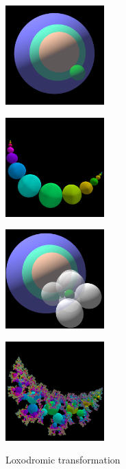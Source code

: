 \begin{figure}[h!tbp]
 \begin{minipage}{0.24\hsize}
  \center
  \includegraphics[width=1.5in, height=1.5in, keepaspectratio]{../img/klein/3diis/loxoGenSimple.pdf}
  \label{fig:loxoGen3d}
 \end{minipage}
 \hspace*{\fill}
 \begin{minipage}{0.24\hsize}
  \center
   \includegraphics[width=1.5in, height=1.5in, keepaspectratio]{../img/klein/3diis/loxoOrbSimple.pdf}
   \label{fig:loxoOrb3d}
 \end{minipage}
 \hspace*{\fill}
 \begin{minipage}{0.24\hsize}
  \center
  \includegraphics[width=1.5in, height=1.5in, keepaspectratio]{../img/klein/3diis/loxoSchottkyGen.pdf}
  \label{fig:loxoOrbSchGen3d}
 \end{minipage}
 \hspace*{\fill}
 \begin{minipage}{0.24\hsize}
  \center
  \includegraphics[width=1.5in, height=1.5in, keepaspectratio]{../img/klein/3diis/loxoOrbSch.pdf}
  \label{fig:loxoOrbSch3d}
 \end{minipage}
 \caption{Loxodromic transformation}
 \label{fig:loxodromic3d}
\end{figure}

